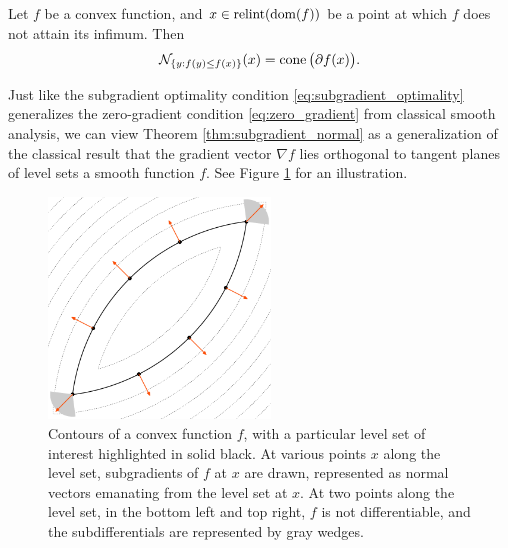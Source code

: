 \begin{Theorem}
\label{thm:subgradient_normal}
Let $f$ be a convex function, and $x \in \operatorname{relint}(\operatorname{dom}(f))$ be a point at which
$f$ does not attain its infimum. Then 
\[
\mathcal{N}_{\{y : f(y) \leq f(x)\}}(x) = \operatorname{cone}\big(\partial f(x)\big).
\]
\end{Theorem}


Just like the subgradient optimality condition \eqref{eq:subgradient_optimality}
generalizes the zero-gradient condition \eqref{eq:zero_gradient} from classical
smooth analysis, we can view Theorem \ref{thm:subgradient_normal} as a
generalization of the classical result that the gradient vector $\nabla f$ lies 
orthogonal to tangent planes of level sets a smooth function $f$. See Figure
\ref{fig:subgradient_normal} for an illustration. 

\begin{figure}[tb]
\centering
\includegraphics[width=0.525\textwidth]{fig/subgradient_normal.pdf}
\caption{Contours of a convex function $f$, with a particular level set of
  interest highlighted in solid black. At various points $x$ along the level
  set, subgradients of $f$ at $x$ are drawn, represented as normal vectors
  emanating from the level set at $x$. At two points along the level set, in the
  bottom left and top right, $f$ is not differentiable, and the subdifferentials
  are represented by gray wedges.}        
\label{fig:subgradient_normal}
\end{figure}

